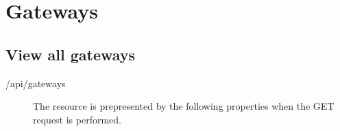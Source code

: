 \documentclass[letterpaper,10pt,english]{sphinxmanual}
\begin{document}
\section{Gateways}
\label{\detokenize{restapi:gateways}}

\subsection{View all gateways}
\label{\detokenize{restapi:view-all-gateways}}
 /api/gateways
\begin{description}
\item[{}] \leavevmode
The resource is prepresented by the following properties when the GET request is performed.

\end{description}
\end{document}
